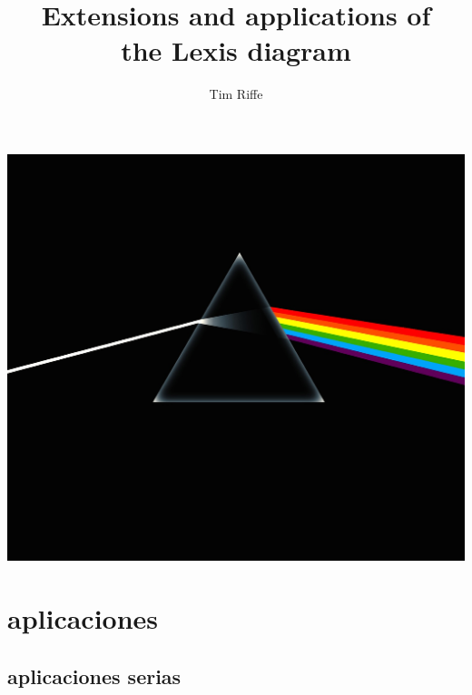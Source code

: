 \documentclass[20pt]{beamer}
\title{Extensions and applications of \\ the Lexis diagram}
\subtitle{Tim Riffe}		%
\begin{document}

\begin{frame}
	\titlepage
\end{frame}



\begin{frame}
\vspace{-15em}
\begin{center}
\hspace*{-6cm}\includegraphics[scale=.7]{Figures/prism.jpg}
\end{center}
\end{frame}

\section{aplicaciones}
\subsection{aplicaciones serias}
\end{document}
